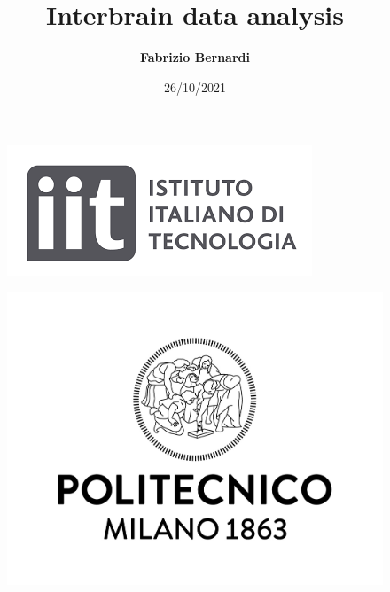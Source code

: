 \documentclass{beamer}
\title{Interbrain data analysis}
\author[F. Bernardi]{\textbf{Fabrizio Bernardi}} \medskip
\date[26/10/2021]{26/10/2021}
\begin{document}
	
	
		\begin{frame}
	\maketitle
	
	\begin{minipage}{\linewidth}
		\centering
		\begin{minipage}{0.45\linewidth}
			\begin{figure}[H]
				\includegraphics[width=\linewidth]{Logo_IIT.png}
				
			\end{figure}
		\end{minipage}
		\hspace{0.05\linewidth}
		\begin{minipage}{0.45\linewidth}
			\begin{figure}[H]
				\includegraphics[width=\linewidth]{Logo_Politecnico_Milano.jpg}
				
			\end{figure}
		\end{minipage}
	\end{minipage}
\end{frame}
\end{document}
